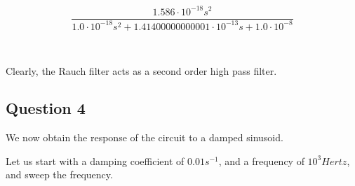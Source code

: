 \documentclass[11pt]{article}
\begin{document}
    $$\frac{1.586 \cdot 10^{-18} s^{2}}{1.0 \cdot 10^{-18} s^{2} + 1.41400000000001 \cdot 10^{-13} s + 1.0 \cdot 10^{-8}}$$

    
    \begin{center}
    \end{center}
    { \hspace*{\fill} \\}
    
    Clearly, the Rauch filter acts as a second order high pass filter.

\hypertarget{question-4}{%
\subsection{Question 4}\label{question-4}}

We now obtain the response of the circuit to a damped sinusoid.

Let us start with a damping coefficient of \(0.01 s^{-1}\), and a
frequency of \(10^{3} Hertz\), and sweep the frequency.
\end{document}
